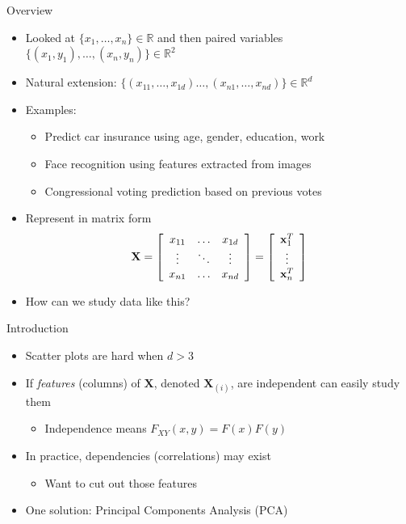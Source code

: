 \documentclass{beamer}
\begin{document}
\begin{frame}{Overview} 
\begin{itemize} 
 \item Looked at $\{x_1, \ldots, x_n\} \in \mathbb{R}$ and then paired variables $\{(x_1, y_1), \ldots, (x_n, y_n)\} \in \mathbb{R}^2$
\item Natural extension: $\{(x_{11}, \ldots, x_{1d}) \ldots, (x_{n1}, \ldots, x_{nd})\} \in \mathbb{R}^d$
\item Examples:
\begin{itemize}
\item Predict car insurance using age, gender, education, work
\item Face recognition using features extracted from images 
\item Congressional voting prediction based on previous votes  
\end{itemize} 
\item Represent in matrix form 
\begin{displaymath} 
 \textbf{X} = \left[\begin{array}{c c c} x_{11} & \ldots & x_{1d} \\ 
                     \vdots & \ddots & \vdots \\
 x_{n1} & \ldots & x_{nd}  \end{array} \right]  = \left[\begin{array}{c} \textbf{x}_1^T \\ \vdots \\  \textbf{x}_n^T \end{array} \right]
\end{displaymath}
\item How can we study data like this? 
 \end{itemize}
\end{frame}

\begin{frame}{Introduction}
\begin{itemize} 
 \item Scatter plots are hard when $d > 3$ 
 \item If \emph{features} (columns) of $\textbf{X}$, denoted $\textbf{X}_{(i)}$, are independent can easily study them 
\begin{itemize} 
 \item Independence means $F_{XY}(x, y) = F(x)F(y)$
\end{itemize}
 \item In practice, dependencies (correlations) may exist
  \begin{itemize}
    \item Want to cut out those features
    \end{itemize}
    \item One solution: Principal Components Analysis (PCA)
\end{itemize}
\end{frame}
\end{document}
